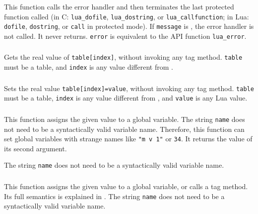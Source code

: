 \subsubsection*{\ff {}}\label{pdf-error}
This function calls the error handler and then terminates
the last protected function called
(in C: \verb|lua_dofile|, \verb|lua_dostring|, or \verb|lua_callfunction|;
in Lua: \verb|dofile|, \verb|dostring|, or \verb|call| in protected mode).
If \verb|message| is \nil, the error handler is not called.
It never returns.
\verb|error| is equivalent to the API function \verb|lua_error|.

\subsubsection*{\ff {}}
Gets the real value of \verb|table[index]|,
without invoking any tag method.
\verb|table| must be a table,
and \verb|index| is any value different from \nil.

\subsubsection*{\ff {}}
Sets the real value \verb|table[index]=value|,
without invoking any tag method.
\verb|table| must be a table,
\verb|index| is any value different from \nil,
and \verb|value| is any Lua value.

\subsubsection*{\ff {}}
This function assigns the given value to a global variable.
The string \verb|name| does not need to be a
syntactically valid variable name.
Therefore,
this function can set global variables with strange names like
\verb|"m v 1"| or \verb|34|.
It returns the value of its second argument.

The string \verb|name| does not need to be a
syntactically valid variable name.

\subsubsection*{\ff {}}
This function assigns the given value to a global variable,
or calls a tag method.
Its full semantics is explained in .
The string \verb|name| does not need to be a
syntactically valid variable name.

